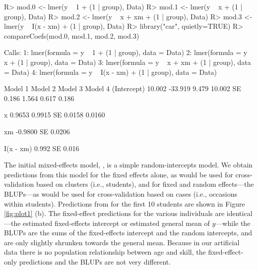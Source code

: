 \documentclass[
]{jss}
\begin{document}
\begin{CodeChunk}
\begin{CodeInput}
R> mod.0 <- lmer(y ~ 1 + (1 | group), Data)
R> mod.1 <- lmer(y ~ x + (1 | group), Data)
R> mod.2 <- lmer(y ~ x + xm + (1 | group), Data)
R> mod.3 <- lmer(y ~ I(x - xm) + (1 | group), Data)
R> library("car", quietly=TRUE)
R> compareCoefs(mod.0, mod.1, mod.2, mod.3)
\end{CodeInput}
\begin{CodeOutput}
Calls:
1: lmer(formula = y ~ 1 + (1 | group), data = Data)
2: lmer(formula = y ~ x + (1 | group), data = Data)
3: lmer(formula = y ~ x + xm + (1 | group), data = Data)
4: lmer(formula = y ~ I(x - xm) + (1 | group), data = Data)

            Model 1 Model 2 Model 3 Model 4
(Intercept)  10.002 -33.919   9.479  10.002
SE            0.186   1.564   0.617   0.186
                                           
x                    0.9653  0.9915        
SE                   0.0158  0.0160        
                                           
xm                          -0.9800        
SE                           0.0206        
                                           
I(x - xm)                             0.992
SE                                    0.016
                                           
\end{CodeOutput}
\end{CodeChunk}

The initial mixed-effects model, , is a simple
random-intercepts model. We obtain predictions from this model for the
fixed effects alone, as would be used for cross-validation based on
clusters (i.e., students), and for fixed and random effects---the
BLUPs---as would be used for cross-validation based on cases (i.e.,
occasions within students). Predictions from  for the first
10 students are shown in Figure \ref{fig:plot1} (b). The fixed-effect
predictions for the various individuals are identical---the estimated
fixed-effects intercept or estimated general mean of \(y\)---while the
BLUPs are the sums of the fixed-effects intercept and the random
intercepts, and are only slightly shrunken towards the general mean.
Because in our artificial data there is no population relationship
between age and skill, the fixed-effect-only predictions and the BLUPs
are not very different.
\end{document}
